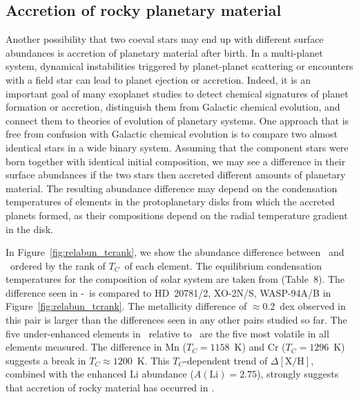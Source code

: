 \documentclass[modern, letterpaper]{aastex61}
\newcommand{\figname}{Figure}
\newcommand*\elem[1]{\ensuremath{\mathrm{#1}}}
\newcommand*\elemH[1]{\ensuremath{[\mathrm{#1}/\elem{H}]}}
\newcommand{\sunanalog}{\text{Krios}}
\newcommand{\bizarreone}{\text{Kronos}}
\newcommand{\Tcondens}{\ensuremath{T_C}}
\begin{document}
\subsection{Accretion of rocky planetary material}
\label{sub:accretion}

Another possibility that two coeval stars may end up with different surface
abundances is accretion of planetary material after birth.
In a multi-planet system, dynamical instabilities triggered by planet-planet
scattering\cite{1996Sci...274..954R,1996Natur.384..619W} or encounters with a
field star\cite{Malmberg:2011aa} can lead to planet ejection or accretion.
Indeed, it is an important goal of many exoplanet studies
to detect chemical signatures of planet formation or accretion,
distinguish them from Galactic chemical evolution, and
connect them to theories of evolution of planetary systems.
One approach that is free from confusion with Galactic chemical evolution
is to compare two almost identical stars in a wide binary system.
Assuming that the component stars were born together with identical
initial composition, we may see a difference in their surface abundances
if the two stars then accreted different amounts of planetary material.
The resulting abundance difference may depend on the condensation
temperatures of elements in the protoplanetary disks from which the accreted
planets formed, as their compositions depend on the radial temperature gradient
in the disk.

In Figure~\ref{fig:relabun_tcrank}, we show the abundance difference
between \bizarreone\ and \sunanalog\ ordered by the rank of \Tcondens\
of each element.
The equilibrium condensation temperatures for the composition of solar system
are taken from \citealt{2003ApJ...591.1220L} (Table~8).
The difference seen in \bizarreone-\sunanalog\ is
compared to HD~20781/2, XO-2N/S, WASP-94A/B in \figname~\ref{fig:relabun_tcrank}.
The metallicity difference of $\approx 0.2$~dex observed in this pair
is larger than the differences seen in any other pairs studied so far.
The five under-enhanced elements in \bizarreone\
relative to \sunanalog\ are the five most volatile in all elements measured.
The difference in \elem{Mn} ($\Tcondens = 1158$~K) and
\elem{Cr} ($\Tcondens = 1296$~K) suggests a break in $\Tcondens \approx 1200$~K.
This $\Tcondens$-dependent trend of $\Delta\elemH{X}$,
combined with the enhanced $\elem{Li}$ abundance ($A(\elem{Li}) = 2.75$),
strongly suggests that accretion of rocky material has occurred in \bizarreone.
\end{document}
